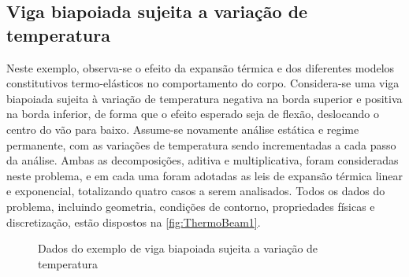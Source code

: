 \documentclass[Tese.tex]{subfiles}
\begin{document}
\subsection{Viga biapoiada sujeita a variação de temperatura}\label{subsec:thermoBeam}

Neste exemplo, observa-se o efeito da expansão térmica e dos diferentes modelos constitutivos termo-elásticos no comportamento do corpo. Considera-se uma viga biapoiada sujeita à variação de temperatura negativa na borda superior e positiva na borda inferior, de forma que o efeito esperado seja de flexão, deslocando o centro do vão para baixo. Assume-se novamente análise estática e regime permanente, com as variações de temperatura sendo incrementadas a cada passo da análise. Ambas as decomposições, aditiva e multiplicativa, foram consideradas neste problema, e em cada uma foram adotadas as leis de expansão térmica linear e exponencial, totalizando quatro casos a serem analisados. Todos os dados do problema, incluindo geometria, condições de contorno, propriedades físicas e discretização, estão dispostos na \autoref{fig:ThermoBeam1}.

\begin{figure}[!htb]
	\centering
	\caption{Dados do exemplo de viga biapoiada sujeita a variação de temperatura}
	\label{fig:ThermoBeam1}
	{\small
		\noindent{}
	}	
\end{figure}
\end{document}
